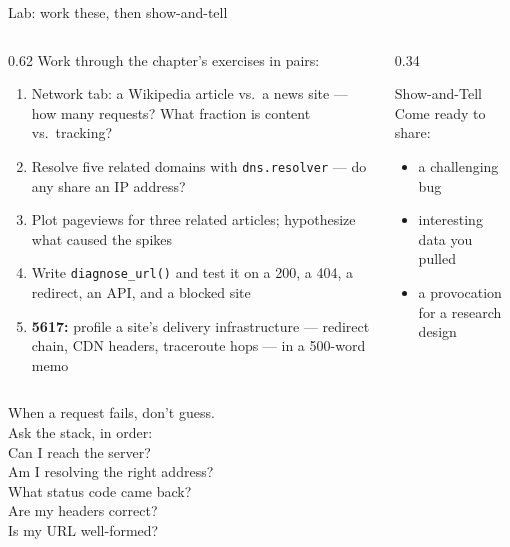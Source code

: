 \documentclass[9pt,aspectratio=169]{beamer}
\begin{document}
\begin{frame}{Lab: work these, then show-and-tell}
    \begin{columns}[T]
        \begin{column}{0.62\textwidth}
            Work through the chapter's exercises in pairs:
            \begin{enumerate}\small
                \item Network tab: a Wikipedia article vs.\ a news site --- how many requests? What fraction is content vs.\ tracking?
                \item Resolve five related domains with \texttt{dns.resolver} --- do any share an IP address?
                \item Plot pageviews for three related articles; hypothesize what caused the spikes
                \item Write \texttt{diagnose\_url()} and test it on a 200, a 404, a redirect, an API, and a blocked site
                \item \textcolor{tab-purple}{\textbf{5617:}} profile a site's delivery infrastructure --- redirect chain, CDN headers, traceroute hops --- in a 500-word memo
            \end{enumerate}
        \end{column}
        \begin{column}{0.34\textwidth}
            \begin{block}{Show-and-Tell}
                \footnotesize Come ready to share:
                \begin{itemize}\footnotesize
                    \item a challenging bug
                    \item interesting data you pulled
                    \item a provocation for a research design
                \end{itemize}
            \end{block}
        \end{column}
    \end{columns}
\end{frame}

\begin{frame}[standout]
    When a request fails, don't guess.\\
    Ask the stack, in order:\\[0.8em]
    {\large Can I reach the server?\\
    Am I resolving the right address?\\
    What status code came back?\\
    Are my headers correct?\\
    Is my URL well-formed?}
\end{frame}
\end{document}
